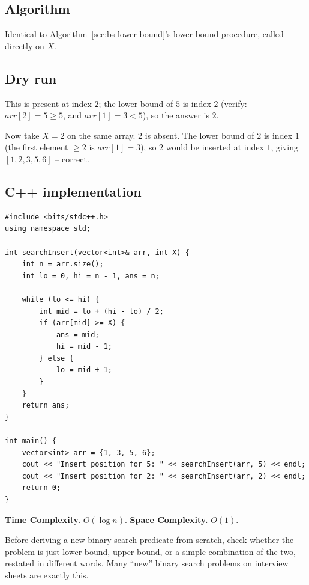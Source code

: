\subsection*{Algorithm}

Identical to Algorithm~\ref{sec:bs-lower-bound}'s lower-bound procedure,
called directly on $X$.

\subsection*{Dry run}


This is present at index $2$; the lower bound of $5$ is index $2$
(verify: $\textit{arr}[2]=5 \ge 5$, and $\textit{arr}[1]=3 < 5$), so the
answer is $2$.

Now take $X = 2$ on the same array. $2$ is absent. The lower bound of $2$
is index $1$ (the first element $\ge 2$ is $\textit{arr}[1]=3$), so $2$
would be inserted at index $1$, giving $[1,2,3,5,6]$ -- correct.

\subsection*{C++ implementation}

\begin{lstlisting}
#include <bits/stdc++.h>
using namespace std;

int searchInsert(vector<int>& arr, int X) {
    int n = arr.size();
    int lo = 0, hi = n - 1, ans = n;

    while (lo <= hi) {
        int mid = lo + (hi - lo) / 2;
        if (arr[mid] >= X) {
            ans = mid;
            hi = mid - 1;
        } else {
            lo = mid + 1;
        }
    }
    return ans;
}

int main() {
    vector<int> arr = {1, 3, 5, 6};
    cout << "Insert position for 5: " << searchInsert(arr, 5) << endl;
    cout << "Insert position for 2: " << searchInsert(arr, 2) << endl;
    return 0;
}
\end{lstlisting}

\begin{complexitybox}
\textbf{Time Complexity.} $O(\log n)$.
\textbf{Space Complexity.} $O(1)$.
\end{complexitybox}

\begin{takeawaybox}
Before deriving a new binary search predicate from scratch, check whether
the problem is just lower bound, upper bound, or a simple combination of
the two, restated in different words. Many ``new'' binary search problems
on interview sheets are exactly this.
\end{takeawaybox}
